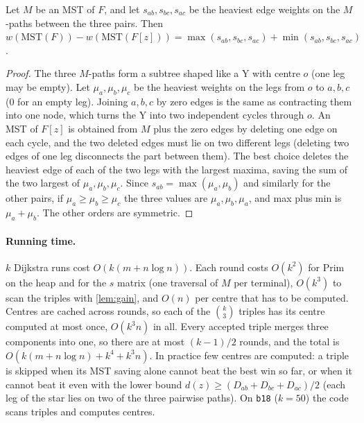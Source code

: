 \begin{lemma}\label{lem:gain}
Let \(M\) be an MST of \(F\), and let \(s_{ab},s_{bc},s_{ac}\) be the heaviest edge weights on the \(M\)-paths between the three
pairs. Then \(w(\mathrm{MST}(F))-w(\mathrm{MST}(F[z]))=\max(s_{ab},s_{bc},s_{ac})+\min(s_{ab},s_{bc},s_{ac})\).
\end{lemma}
\begin{proof}
The three \(M\)-paths form a subtree shaped like a Y with centre \(o\) (one leg may be empty). Let \(\mu_a,\mu_b,\mu_c\) be the
heaviest weights on the legs from \(o\) to \(a,b,c\) (0 for an empty leg). Joining \(a,b,c\) by zero edges is the same as
contracting them into one node, which turns the Y into two independent cycles through \(o\). An MST of \(F[z]\) is obtained from
\(M\) plus the zero edges by deleting one edge on each cycle, and the two deleted edges must lie on two different legs (deleting
two edges of one leg disconnects the part between them). The best choice deletes the heaviest edge of each of the two legs with the
largest maxima, saving the sum of the two largest of \(\mu_a,\mu_b,\mu_c\). Since \(s_{ab}=\max(\mu_a,\mu_b)\) and similarly for the
other pairs, if \(\mu_a\ge\mu_b\ge\mu_c\) the three values are \(\mu_a,\mu_b,\mu_a\), and max plus min is \(\mu_a+\mu_b\). The other
orders are symmetric.
\end{proof}

\paragraph{Running time.} \(k\) Dijkstra runs cost \(O(k(m+n\log n))\). Each round costs \(O(k^2)\) for Prim on the heap and for the
\(s\) matrix (one traversal of \(M\) per terminal), \(O(k^3)\) to scan the triples with \cref{lem:gain}, and \(O(n)\) per centre that
has to be computed. Centres are cached across rounds, so each of the \(\binom{k}{3}\) triples has its centre computed at most once,
\(O(k^3n)\) in all. Every accepted triple merges three components into one, so there are at most \((k-1)/2\) rounds, and the total
is \(O(k(m+n\log n)+k^4+k^3n)\). In practice few centres are computed: a triple is skipped when its MST saving alone cannot beat the
best win so far, or when it cannot beat it even with the lower bound \(d(z)\ge(D_{ab}+D_{bc}+D_{ac})/2\) (each leg of the star lies on two of
the three pairwise paths). On \texttt{b18} (\(k=50\)) the code scans  triples and computes  centres.

